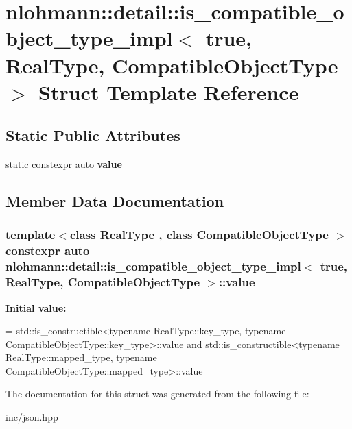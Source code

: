 \hypertarget{structnlohmann_1_1detail_1_1is__compatible__object__type__impl_3_01true_00_01RealType_00_01CompatibleObjectType_01_4}{}\section{nlohmann\+:\+:detail\+:\+:is\+\_\+compatible\+\_\+object\+\_\+type\+\_\+impl$<$ true, Real\+Type, Compatible\+Object\+Type $>$ Struct Template Reference}
\label{structnlohmann_1_1detail_1_1is__compatible__object__type__impl_3_01true_00_01RealType_00_01CompatibleObjectType_01_4}
\subsection*{Static Public Attributes}
\begin{DoxyCompactItemize}
\item 
static constexpr auto {\bfseries value}
\end{DoxyCompactItemize}


\subsection{Member Data Documentation}
\subsubsection[{\texorpdfstring{value}{value}}]{\setlength{\rightskip}{0pt plus 5cm}template$<$class Real\+Type , class Compatible\+Object\+Type $>$ constexpr auto {\bf nlohmann\+::detail\+::is\+\_\+compatible\+\_\+object\+\_\+type\+\_\+impl}$<$ true, Real\+Type, Compatible\+Object\+Type $>$\+::value\hspace{0.3cm}{\ttfamily [static]}}\hypertarget{structnlohmann_1_1detail_1_1is__compatible__object__type__impl_3_01true_00_01RealType_00_01CompatibleObjectType_01_4_afa131fcd3a4fc1881dd350a04589e6cf}{}\label{structnlohmann_1_1detail_1_1is__compatible__object__type__impl_3_01true_00_01RealType_00_01CompatibleObjectType_01_4_afa131fcd3a4fc1881dd350a04589e6cf}
{\bfseries Initial value\+:}
\begin{DoxyCode}
=
        std::is\_constructible<typename RealType::key\_type, typename CompatibleObjectType::key\_type>::value 
      and
        std::is\_constructible<typename RealType::mapped\_type, typename
       CompatibleObjectType::mapped\_type>::value
\end{DoxyCode}


The documentation for this struct was generated from the following file\+:\begin{DoxyCompactItemize}
\item 
inc/json.\+hpp\end{DoxyCompactItemize}
